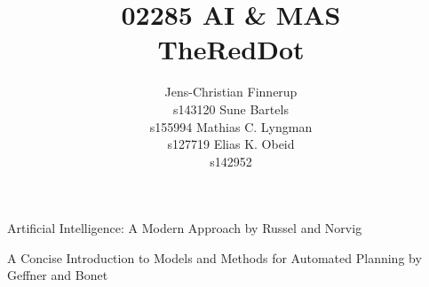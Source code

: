 \documentclass[letterpaper]{article}
\begin{document}
\title{02285 AI \& MAS\\TheRedDot}
\author{
Jens-Christian Finnerup \\ s143120 \And 
Sune Bartels \\ s155994 \And 
Mathias C. Lyngman \\ s127719 \And 
Elias K. Obeid \\ s142952}

\maketitle


Artificial Intelligence: A Modern Approach by Russel and Norvig~\cite{russell2009modern}

A Concise Introduction to Models and Methods for Automated Planning by Geffner and Bonet~\cite{geffner2013concise}












\end{document}
